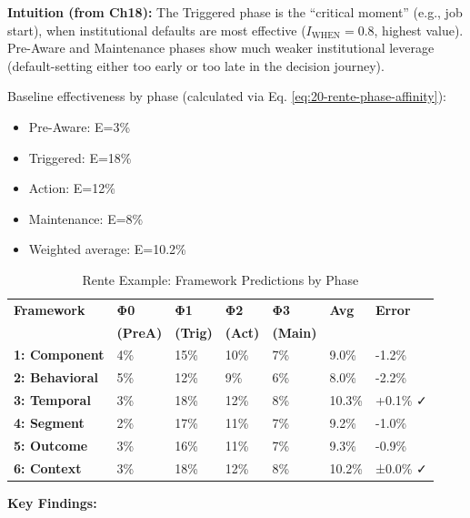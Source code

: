 \textbf{Intuition (from Ch18):} The Triggered phase is the ``critical moment'' (e.g., job start), when institutional defaults are most effective ($I_{\text{WHEN}} = 0.8$, highest value). Pre-Aware and Maintenance phases show much weaker institutional leverage (default-setting either too early or too late in the decision journey).

Baseline effectiveness by phase (calculated via Eq. \ref{eq:20-rente-phase-affinity}):
\begin{itemize}[nosep]
\item Pre-Aware: E=3\%
\item Triggered: E=18\%
\item Action: E=12\%
\item Maintenance: E=8\%
\item Weighted average: E=10.2\%
\end{itemize}

\begin{table}[htbp]
\centering
\caption{Rente Example: Framework Predictions by Phase}
\label{tab:20-ex-rente-frameworks}
\renewcommand{\arraystretch}{1.3}
\footnotesize
\begin{tabular}{@{}lllllll@{}}
\toprule
\textbf{Framework} & \textbf{Φ0} & \textbf{Φ1} & \textbf{Φ2} & \textbf{Φ3} & \textbf{Avg} & \textbf{Error} \\
& \textbf{(PreA)} & \textbf{(Trig)} & \textbf{(Act)} & \textbf{(Main)} & & \\
\midrule
\textbf{1: Component} & 4\% & 15\% & 10\% & 7\% & 9.0\% & -1.2\% \\
\textbf{2: Behavioral} & 5\% & 12\% & 9\% & 6\% & 8.0\% & -2.2\% \\
\textbf{3: Temporal} & 3\% & 18\% & 12\% & 8\% & 10.3\% & +0.1\% ✓ \\
\textbf{4: Segment} & 2\% & 17\% & 11\% & 7\% & 9.2\% & -1.0\% \\
\textbf{5: Outcome} & 3\% & 16\% & 11\% & 7\% & 9.3\% & -0.9\% \\
\textbf{6: Context} & 3\% & 18\% & 12\% & 8\% & 10.2\% & ±0.0\% ✓ \\
\bottomrule
\end{tabular}
\end{table}

\textbf{Key Findings:}

